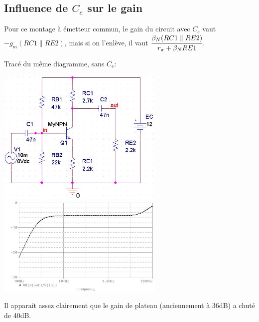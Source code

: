 \documentclass[10pt]{article}
\begin{document}
   \subsection{Influence de $C_e$ sur le gain}
    Pour ce montage à émetteur commun, le gain du circuit avec $C_e$ vaut $-g_m
    (RC1 \parallel RE2)$, mais si on l’enlève, il vaut $\cfrac{\beta_N(RC1
    \parallel RE2)}{r_\pi+\beta_N RE1}$.
    \begin{center}
     Tracé du même diagramme, sans $C_e$:

     \includegraphics[width=8cm]{I-II-c_sans-ce_circuit.jpg}
     \includegraphics[width=8cm]{I-II-c_sans-ce_simu.jpg}
    \end{center}
    Il apparait assez clairement que le gain de plateau (anciennement à 36dB) a
    chuté de 40dB.
   
   \newpage
\end{document}
